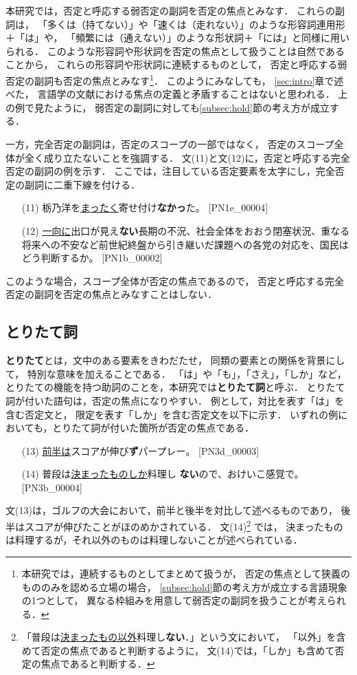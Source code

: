 \documentclass[japanese]{jnlp_1.4}
\begin{document}
本研究では，否定と呼応する弱否定の副詞を否定の焦点とみなす．
これらの副詞は，
「多くは（持てない）」や「速くは（走れない）」のような形容詞連用形＋「は」や，
「頻繁には（通えない）」のような形状詞＋「には」と同様に用いられる．
このような形容詞や形状詞を否定の焦点として扱うことは自然であることから，
これらの形容詞や形状詞に連続するものとして，
否定と呼応する弱否定の副詞も否定の焦点とみなす\footnote{
本研究では，連続するものとしてまとめて扱うが，
否定の焦点として狭義のもののみを認める立場の場合，
\ref{subsec:hold}節の考え方が成立する言語現象の1つとして，
異なる枠組みを用意して弱否定の副詞を扱うことが考えられる．}．
このようにみなしても，
\ref{sec:intro}章で述べた，
言語学の文献における焦点の定義と矛盾することはないと思われる．
上の例で見たように，
弱否定の副詞に対しても\ref{subsec:hold}節の考え方が成立する．

一方，完全否定の副詞は，否定のスコープの一部ではなく，
否定のスコープ全体が全く成り立たないことを強調する\cite{neg2007}．
文(11)と文(12)に，否定と呼応する完全否定の副詞の例を示す．
ここでは，注目している否定要素を太字にし，完全否定の副詞に二重下線を付ける．
\begin{enumerate}
\item[(11)] 栃乃洋を\underline{\underline{まったく}}寄せ付け\textbf{なかっ}た。
  [PN1e\_00004]

\item[(12)] \underline{\underline{一向に}}出口が見え\textbf{ない}長期の不況、社会全体をおおう閉塞状況、重なる将来への不安など前世紀終盤から引き継いだ課題への各党の対応を、国民はどう判断するか。
  [PN1b\_00002]
\end{enumerate}
このような場合，スコープ全体が否定の焦点であるので，
否定と呼応する完全否定の副詞を否定の焦点とみなすことはしない．


\subsection{とりたて詞}
\label{subsec:toritate}

\textbf{とりたて}とは，文中のある要素をきわだたせ，
同類の要素との関係を背景にして，
特別な意味を加えることである\cite{toritate2009}．
「は」や「も」，「さえ」，「しか」など，
とりたての機能を持つ助詞のことを，本研究では\textbf{とりたて詞}と呼ぶ．
とりたて詞が付いた語句は，否定の焦点になりやすい．
例として，対比を表す「は」を含む否定文と，
限定を表す「しか」を含む否定文を以下に示す．
いずれの例においても，とりたて詞が付いた箇所が否定の焦点である．
\begin{enumerate}
\item[(13)] \underline{前半は}スコアが伸び\textbf{ず}パープレー。 
  [PN3d\_00003]
\item[(14)] 普段は\underline{決まったものしか}料理し
  \textbf{ない}ので、おけいこ感覚で。 [PN3b\_00004]
\end{enumerate}
文(13)は，ゴルフの大会において，前半と後半を対比して述べるものであり，
後半はスコアが伸びたことがほのめかされている．
文(14)\footnote{
「普段は\underline{決まったもの以外}料理し\textbf{ない}．」という文において，
「以外」を含めて否定の焦点であると判断するように，
文(14)では，「しか」も含めて否定の焦点であると判断する．}
では，
決まったものは料理するが，それ以外のものは料理しないことが述べられている．
\end{document}
